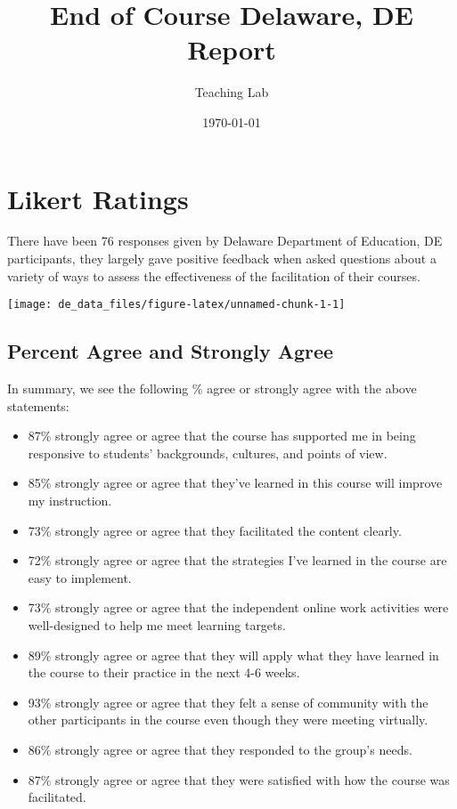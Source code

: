 \documentclass[10,a4paperpaper,]{article}
\title{End of Course Delaware, DE Report}
\author{Teaching Lab}
\date{\today}
\begin{document}
\renewcommand{\contentsname}{Table of Contents}

\renewcommand{\pagename}{Page}

\def\tightlist{}


\maketitle
\tableofcontents
{}
\clearpage

\section{Likert Ratings}

There have been 76 responses given by Delaware Department of Education,
DE participants, they largely gave positive feedback when asked
questions about a variety of ways to assess the effectiveness of the
facilitation of their courses.

\begin{center}\texttt{[image: de\_data\_files/figure-latex/unnamed-chunk-1-1]} \end{center}

\subsection{Percent Agree and Strongly Agree}

In summary, we see the following \% agree or strongly agree with the
above statements:

\begin{itemize}
\tightlist
\item
  87\% strongly agree or agree that the course has supported me in being
  responsive to students' backgrounds, cultures, and points of view.
\item
  85\% strongly agree or agree that they've learned in this course will
  improve my instruction.
\item
  73\% strongly agree or agree that they facilitated the content
  clearly.
\item
  72\% strongly agree or agree that the strategies I've learned in the
  course are easy to implement.
\item
  73\% strongly agree or agree that the independent online work
  activities were well-designed to help me meet learning targets.
\item
  89\% strongly agree or agree that they will apply what they have
  learned in the course to their practice in the next 4-6 weeks.
\item
  93\% strongly agree or agree that they felt a sense of community with
  the other participants in the course even though they were meeting
  virtually.
\item
  86\% strongly agree or agree that they responded to the group's needs.
\item
  87\% strongly agree or agree that they were satisfied with how the
  course was facilitated.
\end{itemize}
\end{document}
